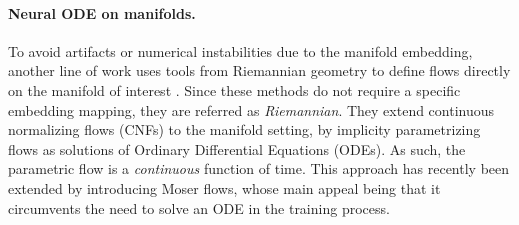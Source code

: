 \paragraph{Neural ODE on manifolds.}
To avoid artifacts or numerical instabilities due to the manifold embedding, another line
of work uses tools from Riemannian geometry to define flows directly on the
manifold of interest
\citep{falorsi2020neural,mathieu2020riemannian,falorsi2021Continuous}.
Since these methods do not require a specific embedding mapping, they 
are referred as \emph{Riemannian}.
They extend continuous normalizing flows (CNFs) \citep{grathwohl2019Scalable} to the manifold setting, by implicity parametrizing flows as solutions of Ordinary Differential Equations (ODEs).
As such, the parametric flow is a \emph{continuous} function of time.
This approach has recently been extended by \cite{rozen2021moser}
introducing Moser flows, whose main appeal being that it circumvents the need to solve an ODE in the training process. %



